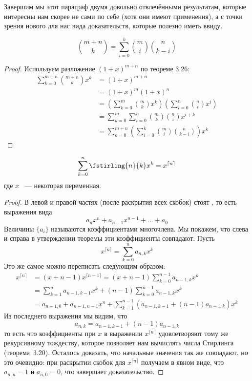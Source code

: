 Завершим мы этот параграф двумя довольно отвлечёнными результатам, которые интересны нам скорее не сами по себе (хотя они имеют применения), а с точки зрения нового для нас вида доказательств, которые полезно иметь ввиду.

\begin{thm}
$${m+n \choose k} = \sum_{i=0}^k {m\choose i}{n\choose k-i}$$
\end{thm}
\begin{proof}
Используем разложение $(1+x)^{m+n}$ по теореме 3.26:
\begin{align*}
\sum_{k=0}^{m+n}{m+n \choose k}x^k & = (1+x)^{m+n} \\
& = (1+x)^m(1+x)^n \\
& = \left(\sum_{k=0}^m{m\choose k}x^k\right) \left(\sum_{i=0}^n {n\choose i}x^i\right) \\
& = \sum_{k=0}^m\sum_{i=0}^n{m\choose k}{n\choose i}x^{i+k} \\
& = \sum_{k=0}^{m+n} \left( \sum_{i=0}^k {m\choose i}{n\choose k-i} \right) x^k
\end{align*}
\end{proof}

\begin{thm}
$$\sum_{k=0}^n \fstirling{n}{k}x^k = x^{\lceil n \rceil}$$
где $x$ ~--- некоторая переменная.
\end{thm}
\begin{proof}
В левой и правой частях (после раскрытия всех скобок) стоят , то есть выражения вида
$$a_n x^n + a_{n-1}x^{n-1} + \ldots + a_{0}$$
Величины $\{a_i\}$ называются коэффициентами многочлена. Мы покажем, что слева и справа в утверждении теоремы эти коэффициенты совпадают. Пусть
$$x^{\lceil n \rceil} = \sum_{k=0}^n a_{n, k} x^k$$
Это же самое можно переписать следующим образом:
\begin{align*}
x^{\lceil n \rceil} &= (x+n-1)x^{\lceil n-1 \rceil} = (x+n-1)\sum_{k=0}^{n-1}a_{n-1, k}x^k \\
& = \sum_{k=1}^n a_{n-1, k-1} x^k + (n-1)\sum_{k=0}^{n-1}a_{n-1,k} x^k \\
& = a_{n-1,0} + a_{n-1, n-1}x^n + \sum_{k=1}^{n-1} (a_{n-1,k-1} + (n-1) a_{n-1, k})x^k
\end{align*}
Из последнего выражения мы видим, что
$$a_{n, k} = a_{n-1, k-1} + (n-1)a_{n-1, k}$$
то есть что коэффициенты при $x$ в выражении $x^{\lceil n \rceil}$ удовлетворяют тому же рекурсивному тождеству, которое позволяет нам вычислять числа Стирлинга (теорема~3.20). Осталось доказать, что начальные значения так же совпадают, но это очевидно: при раскрытии скобок для $x^{\lceil n \rceil}$ получаем в явном виде, что $a_{n, n} = 1$ и $a_{n, 0} = 0$, что завершает доказательство.
\end{proof}